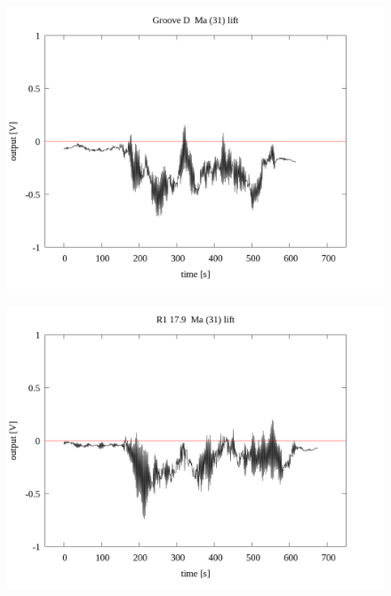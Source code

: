 \documentclass[a4paper]{jsarticle}
\begin{document}
\begin{figure}[htbp]
    \footnotesize
    \begin{center}
        \includegraphics[width=140mm]{../../../33_result/210806/moving_average/31/lift/Groove_D_ma(31)_lift.png}
    \end{center}
\end{figure}

\begin{figure}[htbp]
    \footnotesize
    \begin{center}
        \includegraphics[width=140mm]{../../../33_result/210806/moving_average/31/lift/R1_17.9_ma(31)_lift.png}
    \end{center}
\end{figure}
\end{document}

